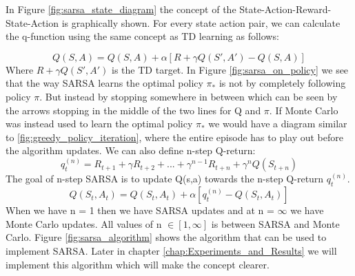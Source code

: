 In Figure \ref{fig:sarsa_state_diagram} the concept of the State-Action-Reward-State-Action is graphically shown. For every state action pair, we can calculate the q-function using the same concept as TD learning as follows:

\begin{equation}
	Q(S,A) = Q(S,A) + \alpha[R+\gamma Q(S',A') - Q(S,A)]
	\label{eq:sarsa_update}
\end{equation}
Where $R+\gamma Q(S',A')$ is the TD target. In Figure \ref{fig:sarsa_on_policy} we see that the way SARSA learns the optimal policy $\pi_{*}$ is not by completely following policy $\pi$. But instead by stopping somewhere in between which can be seen by the arrows stopping in the middle of the two lines for Q and $\pi$. If Monte Carlo was instead used to learn the optimal policy $\pi_{*}$ we would have a diagram similar to \ref{fig:greedy_policy_iteration}, where the entire episode has to play out before the algorithm updates.
We can also define n-step Q-return:
\begin{equation}
	q_{t}^{(n)} = R_{t+1} + \gamma R_{t+2} +...+ \gamma^{n-1}R_{t+n}+\gamma^{n}Q(S_{t+n})
	\label{eq:q_return}
\end{equation}
The goal of n-step SARSA is to update Q(s,a) towards the n-step Q-return $q_t^{(n)}$.
\begin{equation}
	Q(S_t,A_t) = Q(S_t,A_t) + \alpha[q_{t}^{(n)} - Q(S_t,A_t)]
	\label{eq:sarsa_n_step}
\end{equation}
When we have n = 1 then we have SARSA updates and at n = $\infty$ we have Monte Carlo updates. All values of n $\in [1,\infty]$ is between SARSA and Monte Carlo.
Figure \ref{fig:sarsa_algorithm} shows the algorithm that can be used to implement SARSA. Later in chapter \ref{chap:Experiments_and_Results} we will implement this algorithm which will make the concept clearer.

